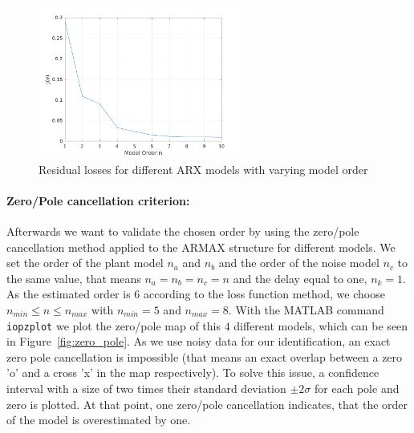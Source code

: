 \begin{figure}[h]
	\centering
	\includegraphics[height=5cm]{figures/Loss_fcn.pdf}
	\caption{Residual losses for different ARX models with varying model order}\label{fig:loss_fcn}
\end{figure}

\paragraph{Zero/Pole cancellation criterion:} Afterwards we want to validate the chosen order by using the zero/pole cancellation method applied to the ARMAX structure for different models. 
We set the order of the plant model $n_a$ and $n_b$ and the order of the noise model $n_c$ to the same value, that means $n_a = n_b = n_c = n $ and the delay equal to one, $n_k = 1$. 
As the estimated order is $6$ according to the loss function method, we choose $ n_{min} \leq n \leq n_{max}$ with $ n_{min} = 5$ and $n_{max}=8$. With the MATLAB command \texttt{iopzplot} we plot the zero/pole map of this $4$ different models, which can be seen in Figure~\ref{fig:zero_pole}. 
As we use noisy data for our identification, an exact zero pole cancellation is impossible (that means an exact overlap between a zero 'o' and a cross 'x' in the map respectively). To solve this issue, a confidence interval with a size of two times their standard deviation $\pm 2 \sigma$ for each pole and zero is plotted. At that point, one zero/pole cancellation indicates, that the order of the model is overestimated by one. 


